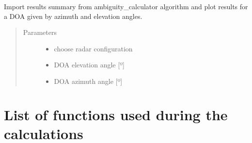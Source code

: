 \documentclass[letterpaper,12pt,english]{sphinxmanual}
\begin{document}
\begin{fulllineitems}
\label{\detokenize{plots_generator:plots_generator.generate_plots}}
Import results summary from ambiguity\_calculator algorithm and plot results for a DOA given by azimuth and elevation
angles.
\begin{quote}\begin{description}
\item[{Parameters}] \leavevmode\begin{itemize}
\item {} 
 \textendash{} choose radar configuration

\item {} 
 \textendash{} DOA elevation angle {[}º{]}

\item {} 
 \textendash{} DOA azimuth angle {[}º{]}

\end{itemize}

\end{description}\end{quote}

\end{fulllineitems}



\chapter{List of functions used during the calculations}
\label{\detokenize{functions:module-functions}}\label{\detokenize{functions:list-of-functions-used-during-the-calculations}}\label{\detokenize{functions::doc}}
\end{document}
